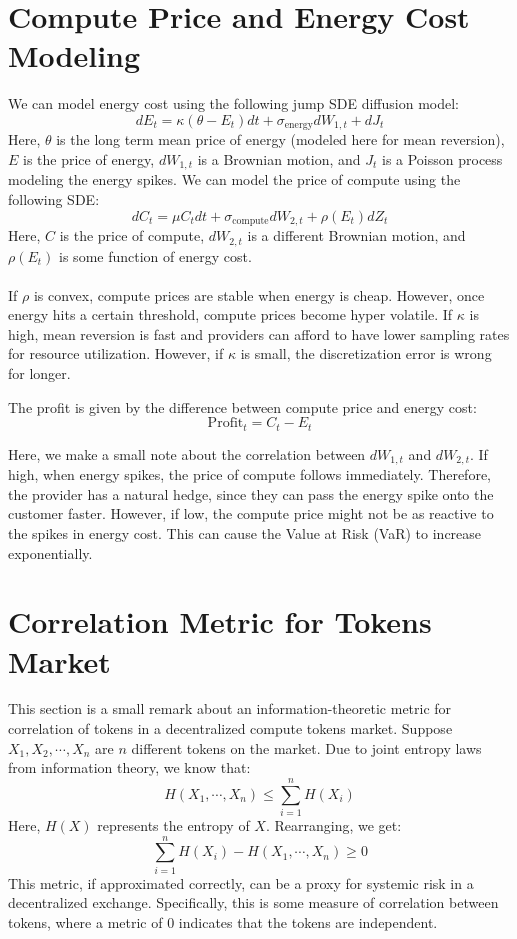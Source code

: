\documentclass{article}
\begin{document}
\section{Compute Price and Energy Cost Modeling}
We can model energy cost using the following jump SDE diffusion model:
\[dE_t = \kappa (\theta - E_t) dt + \sigma_{\text{energy}}dW_{1,t} + dJ_t\]
Here, $\theta$ is the long term mean price of energy (modeled here for mean reversion), $E$ is the price of energy, $dW_{1,t}$ is a Brownian motion, and $J_t$ is a Poisson process modeling the energy spikes. We can model the price of compute using the following SDE:
\[dC_t = \mu C_t dt + \sigma_{\text{compute}} dW_{2,t} + \rho (E_t) dZ_t\]
Here, $C$ is the price of compute, $dW_{2,t}$ is a different Brownian motion, and $\rho(E_t)$ is some function of energy cost. 
\\
\\
If $\rho$ is convex, compute prices are stable when energy is cheap. However, once energy hits a certain threshold, compute prices become hyper volatile. If $\kappa$ is high, mean reversion is fast and providers can afford to have lower sampling rates for resource utilization. However, if $\kappa$ is small, the discretization error is wrong for longer.

The profit is given by the difference between compute price and energy cost: 
\[\text{Profit}_t = C_t - E_t\]

Here, we make a small note about the correlation between $dW_{1,t}$ and $dW_{2,t}$. If high, when energy spikes, the price of compute follows immediately. Therefore, the provider has a natural hedge, since they can pass the energy spike onto the customer faster. However, if low, the compute price might not be as reactive to the spikes in energy cost. This can cause the Value at Risk (VaR) to increase exponentially.

\section{Correlation Metric for Tokens Market}
This section is a small remark about an information-theoretic metric for correlation of tokens in a decentralized compute tokens market. Suppose $X_1, X_2, \cdots , X_n$ are $n$ different tokens on the market. Due to joint entropy laws from information theory, we know that:
\[H(X_1,\cdots,X_n) \leq \sum_{i=1}^n H(X_i)\]
Here, $H(X)$ represents the entropy of $X$. Rearranging, we get:
\[\sum_{i=1}^n H(X_i) - H(X_1,\cdots,X_n) \geq 0\]
This metric, if approximated correctly, can be a proxy for systemic risk in a decentralized exchange. Specifically, this is some measure of correlation between tokens, where a metric of 0 indicates that the tokens are independent. 

\end{document}
